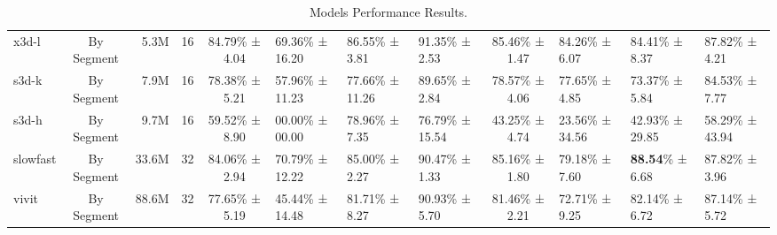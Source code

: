 \begin{table*}[t]
{\begin{tabular}{lcrr||c|lll||c|lll}
            x3d-l & By Segment & 5.3M & 16 & 84.79\% ± 4.04 & 69.36\% ± 16.20 & 86.55\% ± 3.81 & 91.35\% ± 2.53 & 85.46\% ± 1.47 & 84.26\% ± 6.07 & 84.41\% ± 8.37 & 87.82\% ± 4.21 \\
            s3d-k & By Segment & 7.9M & 16 & 78.38\% ± 5.21 & 57.96\% ± 11.23 & 77.66\% ± 11.26 & 89.65\% ± 2.84 & 78.57\% ± 4.06 & 77.65\% ± 4.85 & 73.37\% ± 5.84 & 84.53\% ± 7.77 \\
            s3d-h & By Segment & 9.7M & 16 & 59.52\% ± 8.90 & 00.00\% ± 00.00 & 78.96\% ± 7.35 & 76.79\% ± 15.54 & 43.25\% ± 4.74 & 23.56\% ± 34.56 & 42.93\% ± 29.85 & 58.29\% ± 43.94 \\
            slowfast & By Segment & 33.6M & 32 & 84.06\% ± 2.94 & 70.79\% ± 12.22 & 85.00\% ± 2.27 & 90.47\% ± 1.33 & 85.16\% ± 1.80 & 79.18\% ± 7.60 & \textbf{88.54}\% ± 6.68 & 87.82\% ± 3.96 \\
            vivit & By Segment & 88.6M & 32 & 77.65\% ± 5.19 & 45.44\% ± 14.48 & 81.71\% ± 8.27 & 90.93\% ± 5.70 & 81.46\% ± 2.21 & 72.71\% ± 9.25 & 82.14\% ± 6.72 & 87.14\% ± 5.72 \\
            \bottomrule
        \end{tabular}
    }
    \vspace{-2ex}\caption{Models Performance Results.}
\end{table*}
    
